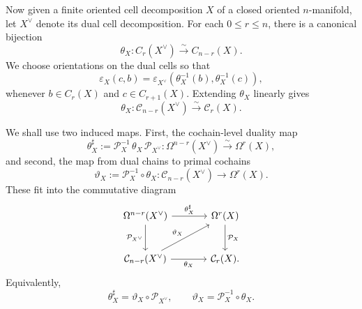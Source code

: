 \documentclass[dvipsnames,a4paper]{article}
\numberwithin{equation}{section}
\theoremstyle{definition}
\theoremstyle{remark}
\begin{document}
Now given a finite oriented cell decomposition  \(X\) of a closed oriented
\(n\)-manifold, let \(X^\vee\) denote its dual cell decomposition.
For each \(0\le r\le n\), there is a canonical bijection
\begin{equation}
	\theta_X:C_r(X^\vee)\xrightarrow{\sim} C_{n-r}(X).
	\label{eq:theta}
\end{equation}
We choose orientations on the dual cells so that
\begin{equation}
	\varepsilon_X(c,b)
	=
	\varepsilon_{X^\vee}\left(\theta_X^{-1}(b),\theta_X^{-1}(c)\right),
	\label{eq:dual-incidence}
\end{equation}
whenever \(b\in C_r(X)\) and \(c\in C_{r+1}(X)\). Extending \(\theta_X\) linearly gives
\begin{equation}
	\theta_X:\mathcal C_{n-r}(X^\vee)\xrightarrow{\sim}\mathcal C_r(X).
	\label{eq:theta-linear}
\end{equation}

We shall use two induced maps. First, the cochain-level duality map
\begin{equation}
	\theta_X^\sharp
	:=
	\mathcal P_X^{-1}\,\theta_X\,\mathcal P_{X^\vee}
	:
	\Omega^{n-r}(X^\vee)\xrightarrow{\sim}\Omega^r(X),
	\label{eq:theta-sharp}
\end{equation}
and second, the map from dual chains to primal cochains
\begin{equation}
	\vartheta_X
	:=
	\mathcal P_X^{-1}\circ \theta_X
	:
	\mathcal C_{n-r}(X^\vee)\to \Omega^r(X).
	\label{eq:vartheta}
\end{equation}
These fit into the commutative diagram
\begin{equation}
	\begin{tikzcd}[column sep=large,row sep=large]
		\Omega^{n-r}(X^\vee)
		\arrow[r,"\theta_X^\sharp"]
		\arrow[d,"\mathcal P_{X^\vee}"']
		&
		\Omega^r(X)
		\arrow[d,"\mathcal P_X"]
		\\
		\mathcal C_{n-r}(X^\vee)
		\arrow[r,"\theta_X"']
		\arrow[ur,"\vartheta_X"]
		&
		\mathcal C_r(X).
	\end{tikzcd}
	\label{eq:structural-diagram}
\end{equation}
Equivalently,
\begin{equation}
	\theta_X^\sharp=\vartheta_X\circ \mathcal P_{X^\vee},
	\qquad
	\vartheta_X=\mathcal P_X^{-1}\circ \theta_X.
\end{equation}
\end{document}
